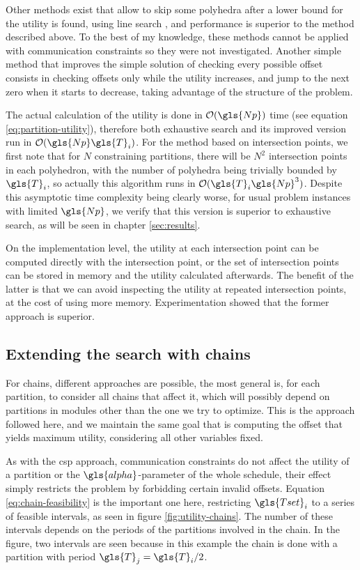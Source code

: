 \documentclass[main.tex]{subfiles}
\begin{document}
Other methods exist that allow to skip some polyhedra after a lower bound for the utility is found, using line search \cite{pira2016line}, and performance is superior to the method described above.
To the best of my knowledge, these methods cannot be applied with communication constraints so they were not investigated.
Another simple method that improves the simple solution of checking every possible offset consists in checking offsets only while the utility increases, and jump to the next zero when it starts to decrease, taking advantage of the structure of the problem.

The actual calculation of the utility is done in $\bigO(\gls{Np})$ time (see equation \ref{eq:partition-utility}), therefore both exhaustive search and its improved version run in $\bigO(\gls{Np}\gls{T}_i)$.
For the method based on intersection points, we first note that for $N$ constraining partitions, there will be $N^2$ intersection points in each polyhedron, with the number of polyhedra being trivially bounded by $\gls{T}_i$, so actually this algorithm runs in $\bigO(\gls{T}_i\gls{Np}^3)$.
Despite this asymptotic time complexity being clearly worse, for usual problem instances with limited $\gls{Np}$, we verify that this version is superior to exhaustive search, as will be seen in chapter \ref{sec:results}.

On the implementation level, the utility at each intersection point can be computed directly with the intersection point, or the set of intersection points can be stored in memory and the utility calculated afterwards.
The benefit of the latter is that we can avoid inspecting the utility at repeated intersection points, at the cost of using more memory.
Experimentation showed that the former approach is superior.

\subsection{Extending the search with chains}
\label{sec:extending-chains}

For chains, different approaches are possible, the most general is, for each partition, to consider all chains that affect it, which will possibly depend on partitions in modules other than the one we try to optimize. 
This is the approach followed here, and we maintain the same goal that is computing the offset that yields maximum utility, considering all other variables fixed.

As with the \gls{csp} approach, communication constraints do not affect the utility of a partition or the $\gls{alpha}$-parameter of the whole schedule, their effect simply restricts the problem by forbidding certain invalid offsets.
Equation \ref{eq:chain-feasibility} is the important one here, restricting $\gls{Tset}_i$ to a series of feasible intervals, as seen in figure \ref{fig:utility-chains}.
The number of these intervals depends on the periods of the partitions involved in the chain. 
In the figure, two intervals are seen because in this example the chain is done with a partition with period $\gls{T}_j=\gls{T}_i/2$.
\end{document}
